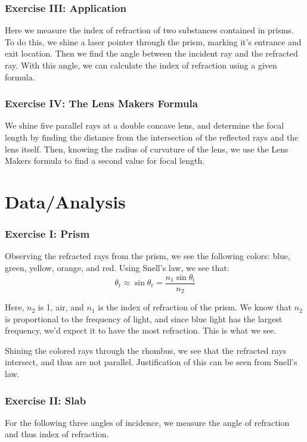 \documentclass[12pt]{article}
\begin{document}
\subsubsection*{Exercise III: Application}
Here we measure the index of refraction of two substances contained in
prisms. To do this, we shine a laser pointer through the prism,
marking it's entrance and exit location. Then we find the angle
between the incident ray and the refracted ray. With this angle, we
can calculate the index of refraction using a given formula.

\subsubsection*{Exercise IV: The Lens Makers Formula}
We shine five parallel rays at a double concave lens, and determine
the focal length by finding the distance from the intersection of the
reflected rays and the lens itself. Then, knowing the radius of
curvature of the lens, we use the Lens Makers formula to find a second
value for focal length. 

\section*{Data/Analysis}
\subsubsection*{Exercise I: Prism}
Observing the refracted rays from the prism, we see the following
colors: blue, green, yellow, orange, and red. Using Snell's law, we
see that:
\[\theta_\mathrm{r} \approx \sin \theta_\mathrm{r} = \frac{n_1\sin\theta_\mathrm{i}}{n_2}\]    

Here, $n_2$ is 1, air, and $n_1$ is the index of refraction of the
prism. We know that $n_2$ is proportional to the frequency of light,
and since blue light has the largest frequency, we'd expect it to have
the most refraction. This is what we see.

Shining the colored rays through the rhombus, we see that the
refracted rays intersect, and thus are not parallel. Justification of
this can be seen from Snell's law.

\subsubsection*{Exercise II: Slab}
For the following three angles of incidence, we measure the angle of
refraction and thus index of refraction. 
\end{document}

